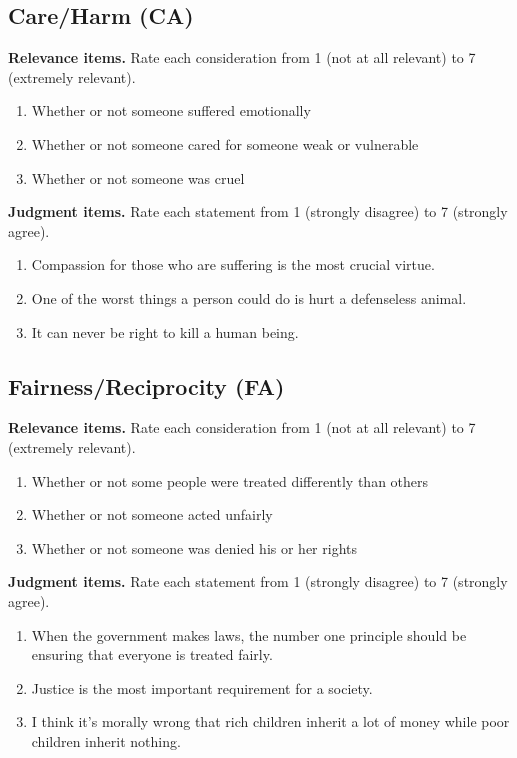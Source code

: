 \documentclass[11pt]{article}
\begin{document}
\subsection*{Care/Harm (CA)}
\textbf{Relevance items.} Rate each consideration from 1 (not at all relevant) to 7 (extremely relevant).
\begin{enumerate}
\item[CA01] Whether or not someone suffered emotionally
\item[CA02] Whether or not someone cared for someone weak or vulnerable
\item[CA03] Whether or not someone was cruel
\end{enumerate}
\textbf{Judgment items.} Rate each statement from 1 (strongly disagree) to 7 (strongly agree).
\begin{enumerate}
\item[CA04] Compassion for those who are suffering is the most crucial virtue.
\item[CA05] One of the worst things a person could do is hurt a defenseless animal.
\item[CA06] It can never be right to kill a human being.
\end{enumerate}
\subsection*{Fairness/Reciprocity (FA)}
\textbf{Relevance items.} Rate each consideration from 1 (not at all relevant) to 7 (extremely relevant).
\begin{enumerate}
\item[FA07] Whether or not some people were treated differently than others
\item[FA08] Whether or not someone acted unfairly
\item[FA09] Whether or not someone was denied his or her rights
\end{enumerate}
\textbf{Judgment items.} Rate each statement from 1 (strongly disagree) to 7 (strongly agree).
\begin{enumerate}
\item[FA10] When the government makes laws, the number one principle should be ensuring that everyone is treated fairly.
\item[FA11] Justice is the most important requirement for a society.
\item[FA12] I think it's morally wrong that rich children inherit a lot of money while poor children inherit nothing.
\end{enumerate}
\end{document}
